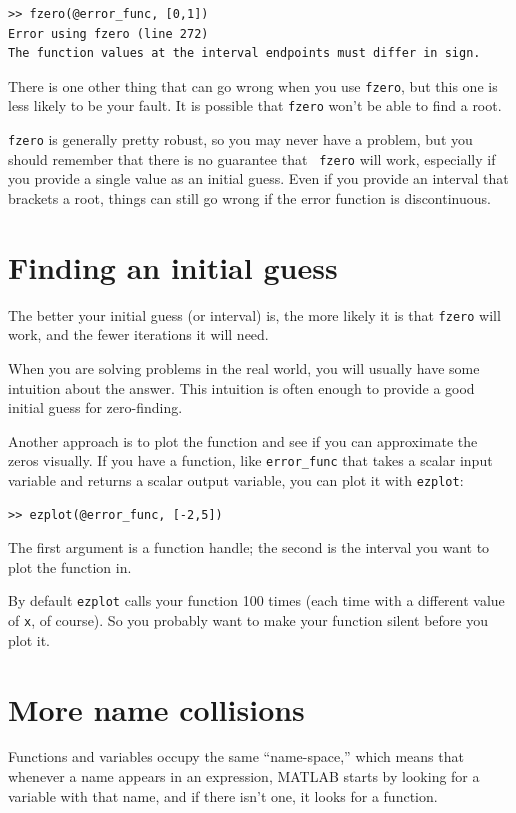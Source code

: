 \documentclass{book}
\begin{document}
\begin{verbatim}
>> fzero(@error_func, [0,1])
Error using fzero (line 272)
The function values at the interval endpoints must differ in sign.
\end{verbatim}

There is one other thing that can go wrong when you use {\tt fzero}, but
this one is less likely to be your fault.  It is possible that {\tt fzero}
won't be able to find a root.

{\tt fzero} is generally pretty robust, so you may never have a
problem, but you should remember that there is no guarantee that {\tt
fzero} will work, especially if you provide a single value as an
initial guess.  Even if you provide an interval that brackets a root,
things can still go wrong if the error function is discontinuous.


\section{Finding an initial guess}

The better your initial guess (or interval) is, the more likely
it is that {\tt fzero} will work, and the fewer iterations it will
need.

When you are solving problems in the real world, you will usually
have some intuition about the answer.  This intuition is often enough
to provide a good initial guess for zero-finding.

Another approach is to plot the function and see if you can
approximate the zeros visually.  If you have a function, like
{\tt error\_func} that takes a scalar input variable and returns
a scalar output variable, you can plot it with {\tt ezplot}:

\begin{verbatim}
>> ezplot(@error_func, [-2,5])
\end{verbatim}

The first argument is a function handle; the second is the
interval you want to plot the function in.

By default {\tt ezplot} calls your function 100 times (each time
with a different value of {\tt x}, of course).  So you probably want
to make your function silent before you plot it.

\section{More name collisions}

Functions and variables occupy the same ``name-space,'' which means
that whenever a name appears in an expression, MATLAB starts by looking
for a variable with that name, and if there isn't one, it looks for
a function.
\end{document}
